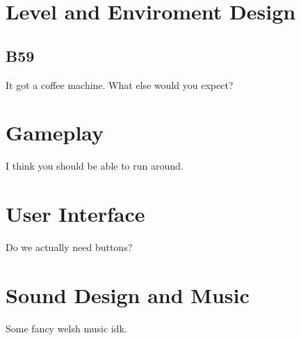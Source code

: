 \documentclass{article}
\begin{document}
\section{Level and Enviroment Design}
\subsection{B59}
It got a coffee machine. What else would you expect?

\section{Gameplay}
I think you should be able to run around.

\section{User Interface}
Do we actually need buttons?

\section{Sound Design and Music}
Some fancy welsh music idk.
\end{document}
